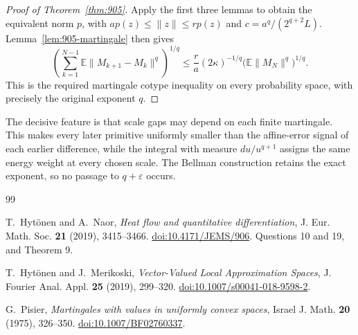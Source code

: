\documentclass[11pt,a4paper]{article}
\theoremstyle{remark}
\begin{document}
\begin{proof}[Proof of Theorem~\ref{thm:905}]
Apply the first three lemmas to obtain the equivalent norm $p$, with
$a p(z)\le\|z\|\le r p(z)$ and
$c=a^q/(2^{q+2}L)$. Lemma~\ref{lem:905-martingale} then gives
\[
 \left(\sum_{k=1}^{N-1}\mathbb E\|M_{k+1}-M_k\|^q\right)^{1/q}
 \le\frac{r}{a}(2\kappa)^{-1/q}
       \bigl(\mathbb E\|M_N\|^q\bigr)^{1/q}.
\]
This is the required martingale cotype inequality on every probability
space, with precisely the original exponent $q$.
\end{proof}

The decisive feature is that scale gaps may depend on each finite
martingale.  This makes every later primitive uniformly smaller than
the affine-error signal of each earlier difference, while the integral
with measure $du/u^{q+1}$ assigns the same energy weight at every chosen
scale.  The Bellman construction retains the exact exponent, so no
passage to $q+\varepsilon$ occurs.


\begin{thebibliography}{99}
\small
\setlength{\itemsep}{3pt}

T.~Hyt\"onen and A.~Naor,
\emph{Heat flow and quantitative differentiation},
J. Eur. Math. Soc. \textbf{21} (2019), 3415--3466.
\href{https://doi.org/10.4171/JEMS/906}{doi:10.4171/JEMS/906}.
Questions 10 and 19, and Theorem 9.

T.~Hyt\"onen and J.~Merikoski,
\emph{Vector-Valued Local Approximation Spaces},
J. Fourier Anal. Appl. \textbf{25} (2019), 299--320.
\href{https://doi.org/10.1007/s00041-018-9598-2}{doi:10.1007/s00041-018-9598-2}.

G.~Pisier,
\emph{Martingales with values in uniformly convex spaces},
Israel J. Math. \textbf{20} (1975), 326--350.
\href{https://doi.org/10.1007/BF02760337}{doi:10.1007/BF02760337}.
\end{thebibliography}
\end{document}
